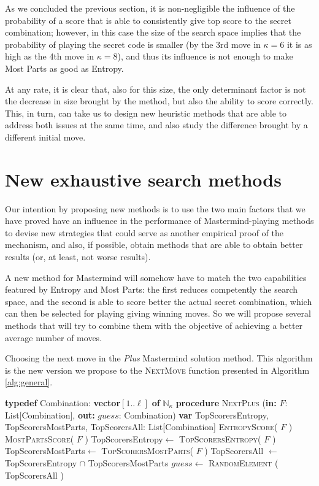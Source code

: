 \documentclass[preprint,12pt]{elsarticle}
\begin{document}
As we concluded the previous section, it is non-negligible the
influence of the probability of a score that is able to consistently
give top score to the secret combination; however, in this case the
size of the search space implies that the probability of playing the
secret code is smaller (by the 3rd move in $\kappa=6$ it is as high as
the 4th move in $\kappa=8$), and thus its influence is not enough to
make Most Parts as good as Entropy.

At any rate, it is clear that, also for this size, the only
determinant factor is not the decrease in size brought by the method,
but also the ability to score correctly. This, in turn, can take us to
design new heuristic methods that are able to address both issues at
the same time, and also study the difference brought by a different
initial move. 

\section{New exhaustive search methods}
\label{s:nsm}

Our intention by proposing new methods is to use the two main factors
that we have proved have an influence in the performance of
Mastermind-playing methods to devise new strategies that could serve
as another empirical proof of the mechanism, and also, if possible,
obtain methods that are able to obtain better results (or, at least,
not worse results).

A new method for Mastermind will somehow have to match the two
capabilities featured by Entropy and Most Parts: the first reduces
competently the search space, and the second is able to score better
the actual secret combination, which can then be selected for playing
giving winning moves. So we will propose several methods that will try
to combine them with the objective of achieving a better average
number of moves.
%
\begin{algorithm*}[htb!]
\caption{Choosing the next move in the {\em Plus} Mastermind solution
  method. This algorithm is the new version we propose to the
  \textsc{NextMove} function presented in Algorithm \ref{alg:general}.}\label{alg:plus}
\smallskip
\textbf{typedef} Combination: \textbf{vector}$[1..\ell]$ \textbf{of} $\mathbb{N}_\kappa$\;
\BlankLine
\textbf{procedure} \textsc{NextPlus} (\textbf{in:} $F$: List[Combination], \textbf{out:} $guess$: Combination)\;
\textbf{var} TopScorersEntropy, 
 TopScorersMostParts, 
 TopScorersAll: List[Combination]\; 
\textsc{EntropyScore}( $F$ )\;
\textsc{MostPartsScore}( $F$ )\;
TopScorersEntropy$\leftarrow$ \textsc{TopScorersEntropy}( $F$ )\;
TopScorersMostParts$\leftarrow$ \textsc{TopScorersMostParts}( $F$ )\;
TopScorersAll $\leftarrow$ TopScorersEntropy $\cap$ TopScorersMostParts\;
$guess\leftarrow$ \textsc{RandomElement} ( TopScorersAll )\;
\end{algorithm*}
\end{document}
